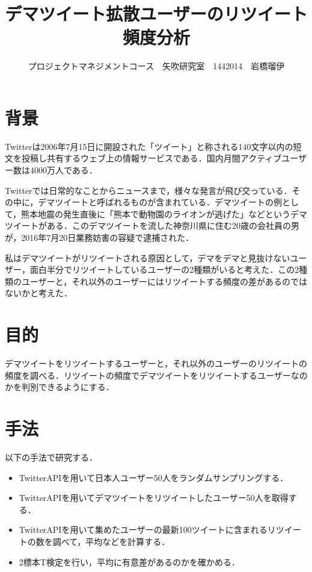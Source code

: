 \documentclass[uplatex,twocolumn,dvipdfmx]{jsarticle}
\title{\vspace{-5mm}\fontsize{14pt}{0pt}\selectfont デマツイート拡散ユーザーのリツイート頻度分析}
\author{\normalsize プロジェクトマネジメントコース　矢吹研究室　1442014　岩橋瑠伊}
\date{}
\begin{document}
\fontsize{10.5pt}{\baselineskip}\selectfont
\maketitle





\section{背景}
Twitterは2006年7月15日に開設された「ツイート」と称される140文字以内の短文を投稿し共有するウェブ上の情報サービスである．国内月間アクティブユーザー数は4000万人である\cite{twitter}．

Twitterでは日常的なことからニュースまで，様々な発言が飛び交っている．その中に，デマツイートと呼ばれるものが含まれている．デマツイートの例として，熊本地震の発生直後に「熊本で動物園のライオンが逃げた」などというデマツイートがある．このデマツイートを流した神奈川県に住む20歳の会社員の男が，2016年7月20日業務妨害の容疑で逮捕された\cite{dema}．

私はデマツイートがリツイートされる原因として，デマをデマと見抜けないユーザー，面白半分でリツイートしているユーザーの2種類がいると考えた．この2種類のユーザーと，それ以外のユーザーにはリツイートする頻度の差があるのではないかと考えた．

\section{目的}
デマツイートをリツイートするユーザーと，それ以外のユーザーのリツイートの頻度を調べる．リツイートの頻度でデマツイートをリツイートするユーザーなのかを判別できるようにする．

\section{手法}
以下の手法で研究する．
\begin{itemize}
\item TwitterAPIを用いて日本人ユーザー50人をランダムサンプリングする．
\item TwitterAPIを用いてデマツイートをリツイートしたユーザー50人を取得する．
\item TwitterAPIを用いて集めたユーザーの最新100ツイートに含まれるリツイートの数を調べて，平均などを計算する．
\item 2標本T検定を行い，平均に有意差があるのかを確かめる．
\end{itemize}
\end{document}
